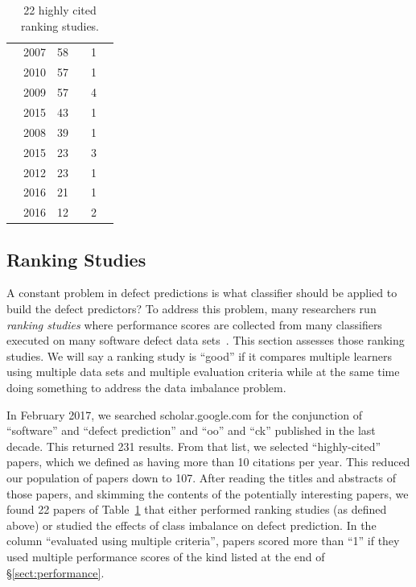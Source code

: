 \documentclass[10pt,conference]{IEEEtran}
\newcommand{\cmark}{\ding{51}}%
\newcommand{\xmark}{\ding{55}}%
\theoremstyle{break}
\theoremstyle{break}
\newcommand{\tion}[1]{{\S}\ref{sect:#1}}
\begin{document}
\begin{table}[!t]
\begin{tabular}{c@{~}|c@{~}|c@{~}|c@{~}|c@{~}|c@{~}}
        \cite{pelayo2007applying} & 2007 & 58 & \xmark & 1 & \cmark \\  
        \cite{khoshgoftaar2010attribute} & 2010 & 57 & \cmark & 1 & \cmark  \\  
        \cite{jiang2009variance} & 2009 & 57 & \cmark & 4 & \xmark  \\  
        \cite{ghotra2015revisiting} & 2015 & 43 & \cmark & 1 & \xmark  \\  
        \cite{jiang2008can} & 2008 & 39 & \cmark & 1 & \cmark  \\  
        \cite{tan2015online} & 2015 & 23 & \xmark & 3 & \cmark \\  
        \cite{pelayo2012evaluating} & 2012 & 23 & \xmark & 1 & \cmark \\  
        \cite{tantithamthavorn2016automated} & 2016 & 21 & \cmark & 1 & \xmark\\  
        \cite{fu2016tuning} & 2016 & 12 & \cmark & 2 & \xmark  \\    
\end{tabular}
\caption{22 highly cited ranking studies.}
\label{tbl:survey2}
\vspace{-0.5cm}
\end{table}

\subsection{Ranking Studies}
\label{sect:rank}

A constant problem in defect predictions is what  classifier should be applied to  build  the  defect  predictors?
To address this problem, many researchers run {\em ranking studies} where  performance scores 
are collected from  many classifiers  executed on  many software defect data sets~\cite{lessmann2008benchmarking,hall2012systematic,elish2008predicting,menzies2010defect,gondra2008applying,radjenovic2013software,jiang2008techniques,wang2013using,mende2009revisiting,li2012sample,khoshgoftaar2010attribute,jiang2009variance,ghotra2015revisiting,jiang2008can,tantithamthavorn2016automated,fu2016tuning}.
This section assesses those ranking studies. We will say a ranking study is ``good'' if it compares multiple learners using multiple data sets and multiple evaluation criteria
while at the same time doing something to address the data imbalance problem.

 In February  2017,  we searched
scholar.google.com for the conjunction of ``software'' and ``defect prediction'' and ``oo'' and ``ck'' published in the last decade. This returned 231 results.
From that list, we selected ``highly-cited'' papers, which we defined as having more than 10 citations per year.  This reduced our population of papers down to 107.
After reading the titles and abstracts of those papers, and skimming the contents of the potentially interesting papers, we found 22 papers of Table~\ref{tbl:survey2} that either performed ranking studies
(as defined above) or studied the effects of class imbalance on defect prediction. In the column ``evaluated using
multiple criteria'',
papers scored more than ``1'' if they used multiple performance scores  of the kind listed at the end of \tion{performance}. 
\end{document}
